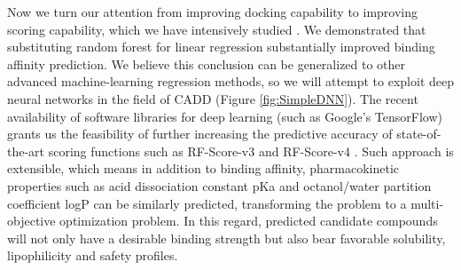 \documentclass[a4paper,12pt]{article}
\begin{document}


Now we turn our attention from improving docking capability to improving scoring capability, which we have intensively studied \citep{1432,1647,1796,1433,1795,1797,1434,1663}. We demonstrated that substituting random forest for linear regression substantially improved binding affinity prediction. We believe this conclusion can be generalized to other advanced machine-learning regression methods, so we will attempt to exploit deep neural networks in the field of CADD \citep{1810} (Figure \ref{fig:SimpleDNN}). The recent availability of software libraries for deep learning (such as Google's TensorFlow) grants us the feasibility of further increasing the predictive accuracy of state-of-the-art scoring functions such as RF-Score-v3 \citep{1647} and RF-Score-v4 \citep{1795}. Such approach is extensible, which means in addition to binding affinity, pharmacokinetic properties such as acid dissociation constant pKa and octanol/water partition coefficient logP can be similarly predicted, transforming the problem to a multi-objective optimization problem. In this regard, predicted candidate compounds will not only have a desirable binding strength but also bear favorable solubility, lipophilicity and safety profiles.

\end{document}
